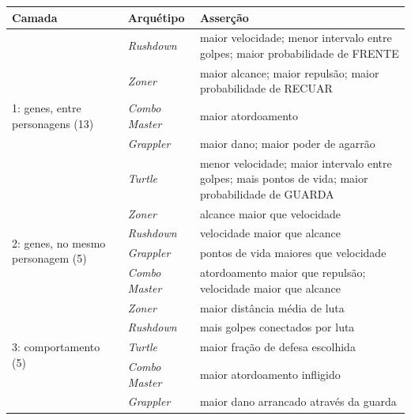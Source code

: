 \begin{quadro}[htbp]
    \caption{As 23 asserções do validador de identidade.}
    \label{quad: validador}
    \centering
    \small
    \begin{tabularx}{\textwidth}{p{2.7cm} l X}
        \toprule
        \textbf{Camada} & \textbf{Arquétipo} & \textbf{Asserção} \\
        \midrule
        \multirow{5}{=}{1: genes, entre personagens (13)}
                        & \textit{Rushdown} & maior velocidade; menor intervalo entre golpes; maior probabilidade de FRENTE \\
                        & \textit{Zoner} & maior alcance; maior repulsão; maior probabilidade de RECUAR \\
                        & \textit{Combo Master} & maior atordoamento \\
                        & \textit{Grappler} & maior dano; maior poder de agarrão \\
                        & \textit{Turtle} & menor velocidade; maior intervalo entre golpes; mais pontos de vida; maior probabilidade de GUARDA \\
        \midrule
        \multirow{4}{=}{2: genes, no mesmo personagem (5)}
                        & \textit{Zoner} & alcance maior que velocidade \\
                        & \textit{Rushdown} & velocidade maior que alcance \\
                        & \textit{Grappler} & pontos de vida maiores que velocidade \\
                        & \textit{Combo Master} & atordoamento maior que repulsão; velocidade maior que alcance \\
        \midrule
        \multirow{5}{=}{3: comportamento (5)}
                        & \textit{Zoner} & maior distância média de luta \\
                        & \textit{Rushdown} & mais golpes conectados por luta \\
                        & \textit{Turtle} & maior fração de defesa escolhida \\
                        & \textit{Combo Master} & maior atordoamento infligido \\
                        & \textit{Grappler} & maior dano arrancado através da guarda \\
        \bottomrule
    \end{tabularx}
    \source
\end{quadro}

